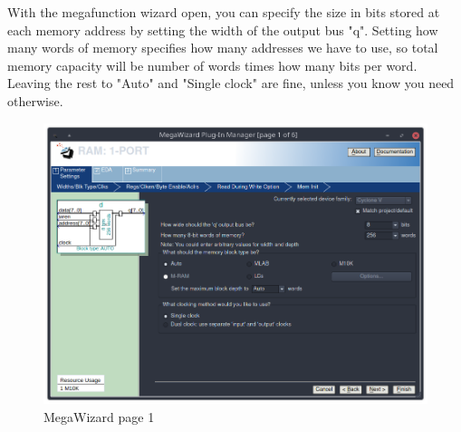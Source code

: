 \documentclass[letter,12pt]{article}
\begin{document}
With the megafunction wizard open, you can specify the size in bits stored at each memory address by setting the width of the output bus "q". Setting how many words of memory specifies how many addresses we have to use, so total memory capacity will be number of words times how many bits per word. Leaving the rest to "Auto" and "Single clock" are fine, unless you know you need otherwise.

\begin{figure}[H]
  \centering
  \includegraphics[width=.83\linewidth]{pics/Mega1.png}
  \caption{MegaWizard page 1}
\end{figure}
\end{document}
